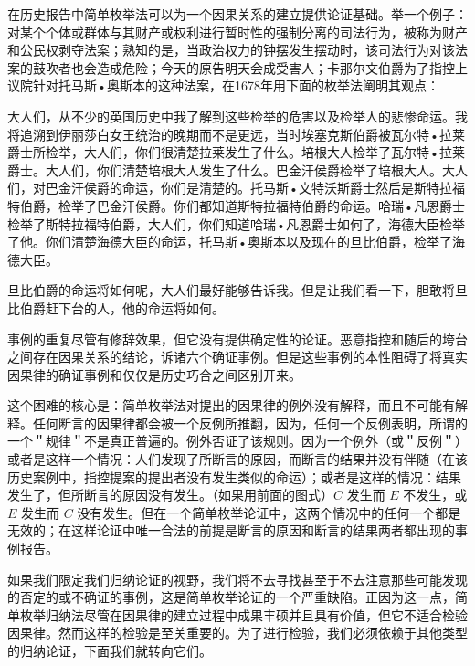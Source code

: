 在历史报告中简单枚举法可以为一个因果关系的建立提供论证基础。举一个例子：对某个个体或群体与其财产或权利进行暂时性的强制分离的司法行为，被称为财产和公民权剥夺法案；熟知的是，当政治权力的钟摆发生摆动时，该司法行为对该法案的鼓吹者也会造成危险；今天的原告明天会成受害人；卡那尔文伯爵为了指控上议院针对托马斯•奥斯本的这种法案，在1678年用下面的枚举法阐明其观点：

大人们，从不少的英国历史中我了解到这些检举的危害以及检举人的悲惨命运。我将追溯到伊丽莎白女王统治的晚期而不是更远，当时埃塞克斯伯爵被瓦尔特•拉莱爵士所检举，大人们，你们很清楚拉莱发生了什么。培根大人检举了瓦尔特•拉莱爵士。大人们，你们清楚培根大人发生了什么。巴金汗侯爵检举了培根大人。大人们，对巴金汗侯爵的命运，你们是清楚的。托马斯•文特沃斯爵士然后是斯特拉福特伯爵，检举了巴金汗侯爵。你们都知道斯特拉福特伯爵的命运。哈瑞•凡恩爵士检举了斯特拉福特伯爵，大人们，你们知道哈瑞•凡恩爵士如何了，海德大臣检举了他。你们清楚海德大臣的命运，托马斯•奥斯本以及现在的旦比伯爵，检举了海德大臣。

旦比伯爵的命运将如何呢，大人们最好能够告诉我。但是让我们看一下，胆敢将旦比伯爵赶下台的人，他的命运将如何。\cite{roberts1966}

事例的重复尽管有修辞效果，但它没有提供确定性的论证。恶意指控和随后的垮台之间存在因果关系的结论，诉诸六个确证事例。但是这些事例的本性阻碍了将真实因果律的确证事例和仅仅是历史巧合之间区别开来。

这个困难的核心是：简单枚举法对提出的因果律的例外没有解释，而且不可能有解释。任何断言的因果律都会被一个反例所推翻，因为，任何一个反例表明，所谓的一个＂规律＂不是真正普遍的。例外否证了该规则。因为一个例外（或＂反例＂）或者是这样一个情况：人们发现了所断言的原因，而断言的结果并没有伴随（在该历史案例中，指控提案的提出者没有发生类似的命运）；或者是这样的情况：结果发生了，但所断言的原因没有发生。（如果用前面的图式）$C$ 发生而 $E$ 不发生，或 $E$ 发生而 $C$ 没有发生。但在一个简单枚举论证中，这两个情况中的任何一个都是无效的；在这样论证中唯一合法的前提是断言的原因和断言的结果两者都出现的事例报告。

如果我们限定我们归纳论证的视野，我们将不去寻找甚至于不去注意那些可能发现的否定的或不确证的事例，这是简单枚举论证的一个严重缺陷。正因为这一点，简单枚举归纳法尽管在因果律的建立过程中成果丰硕并且具有价值，但它不适合检验因果律。然而这样的检验是至关重要的。为了进行检验，我们必须依赖于其他类型的归纳论证，下面我们就转向它们。 

